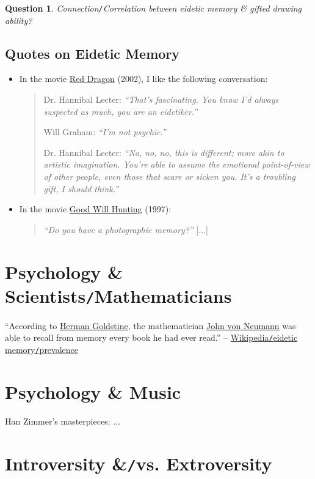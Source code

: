 \documentclass[oneside]{book}
\numberwithin{equation}{section}
\newtheorem{question}{Question}[chapter]
\begin{document}
\begin{question}
	Connection\emph{\texttt{/}}Correlation between eidetic memory \& gifted drawing ability?
\end{question}

\subsection{Quotes on Eidetic Memory}
\begin{itemize}
	\item In the movie \href{https://www.imdb.com/title/tt0289765/}{Red Dragon} (2002), I like the following conversation:
	\begin{quotation}
		Dr. Hannibal Lecter: \textit{``That's fascinating. You know I'd always suspected as much, you are an eidetiker.''}
		
		Will Graham: \textit{``I'm not psychic.''}
		
		Dr. Hannibal Lecter: \textit{``No, no, no, this is different; more akin to artistic imagination. You're able to assume the emotional point-of-view of other people, even those that scare or sicken you. It's a troubling gift, I should think.''}
	\end{quotation}
	\item In the movie \href{https://www.imdb.com/title/tt0119217/}{Good Will Hunting} (1997):
	\begin{quotation}
		\textit{``Do you have a photographic memory?''} [$\ldots$]
	\end{quotation}
\end{itemize}

\section{Psychology \& Scientists\texttt{/}Mathematicians}
``According to \href{https://en.wikipedia.org/wiki/Herman_Goldstine}{Herman Goldstine}, the mathematician \href{https://en.wikipedia.org/wiki/John_von_Neumann}{John von Neumann} was able to recall from memory every book he had ever read.'' -- \href{https://en.wikipedia.org/wiki/Eidetic_memory#Prevalence}{Wikipedia\texttt{/}eidetic memory\texttt{/}prevalence}

\section{Psychology \& Music}
Han Zimmer's masterpieces: $\ldots$

\section{Introversity \&\texttt{/}vs. Extroversity}
\end{document}
